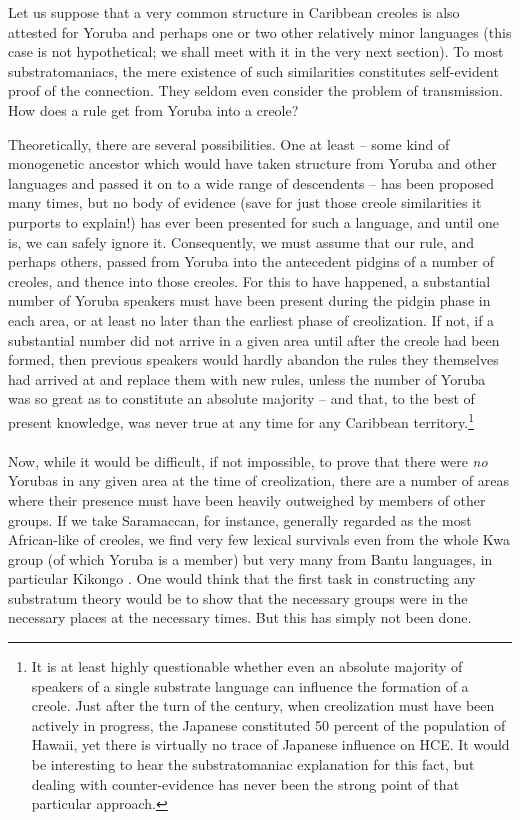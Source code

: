 Let us suppose that a very common structure in Caribbean creoles is also attested for Yoruba and perhaps one or two other rela\-tively minor languages (this case is not hypothetical; we shall meet with it in the very next section). To most substratomaniacs, the mere existence of such similarities constitutes self-evident proof of the connection. They seldom even consider the problem of transmission. How does a rule get from Yoruba into a creole?

Theoretically, there are several possibilities. One at least -- some kind of monogenetic ancestor which would have taken structure from Yoruba and other languages and passed it on to a wide range of descen\-dents -- has been proposed many times, but no body of evidence (save for just those creole similarities it purports to explain!) has ever been presented for such a language, and until one is, we can safely ignore it. Consequently, we must assume that our rule, and perhaps others, passed from Yoruba into the antecedent pidgins of a number of creoles, and thence into those creoles. For this to have happened, a substantial number of Yoruba speakers must have been present during the pidgin
phase in each area, or at least no later than the earliest phase of creoli\-zation. If not, if a substantial number did not arrive in a given area until after the creole had been formed, then previous speakers would hardly abandon the rules they themselves had arrived at and replace them with new rules, unless the number of Yoruba was so great as to constitute an absolute majority -- and that, to the best of present knowledge, was never true at any time for any Caribbean territory.\footnote{It is at least highly questionable whether even an absolute majority of speakers of a single substrate language can influence the formation of a creole. Just after the turn of the century, when creolization must have been actively in progress, the Japanese constituted 50 percent of the population of Hawaii, yet there is virtually no trace of Japanese influence on HCE. It would be interesting to hear the substratomaniac explanation for this fact, but dealing with counter-evidence has never been the strong point of that particular approach.}\\\\

Now, while it would be difficult, if not impossible, to prove that there were \textit{no} Yorubas in any given area at the time of creolization, there are a number of areas where their presence must have been heavily outweighed by members of other groups. If we take Sara\-maccan, for instance, generally regarded as the most African-like of creoles, we find very few lexical survivals even from the whole Kwa group (of which Yoruba is a member) but very many from Bantu lan\-guages, in particular Kikongo \citep{Daeleman1972}. One would think that the first task in constructing any substratum theory would be to show that the necessary groups were in the necessary places at the necessary times. But this has simply not been done.

